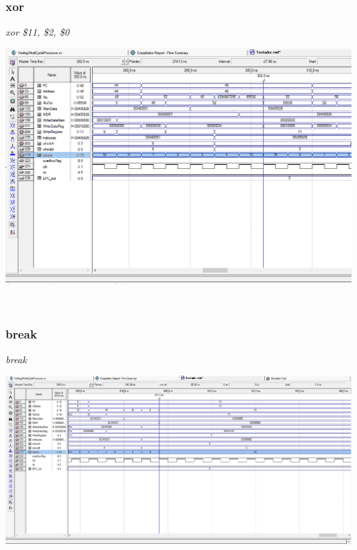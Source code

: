 \documentclass{article}
\begin{document}
    \\
    \subsubsection{xor}
    {\it xor \$11, \$2, \$0}\\
    \begin{center}
        \includegraphics[scale=0.25]{xor.PNG}
    \end{center}
    
    \\
    \subsubsection{break}
    {\it break}\\
    \begin{center}
        \includegraphics[scale=0.25]{break.PNG}
    \end{center}
    
    \\
\end{document}
